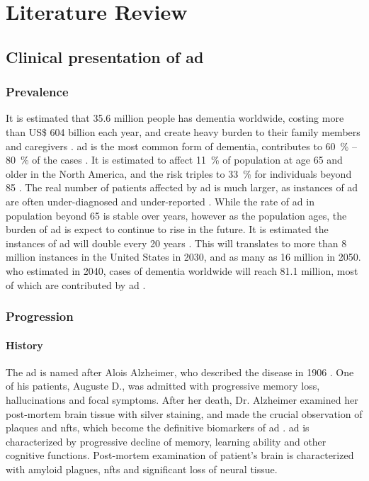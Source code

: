\chapter{Literature Review}

\section{Clinical presentation of \gls{ad}}
\subsection{Prevalence}
It is estimated that 35.6 million people has dementia worldwide, costing more than US\$ 604 billion each year, and create heavy burden to their family members and caregivers \citep{who13}. \gls{ad} is the most common form of dementia, contributes to \SI{60}{\percent} -- \SI{80}{\percent} of the cases \citep{ad16}. It is estimated to affect \SI{11}{\percent} of population at age 65 and older in the North America, and the risk triples to \SI{33}{\percent} for individuals beyond 85 \citep{hebert13}. The real number of patients affected by \gls{ad} is much larger, as instances of \gls{ad} are often under-diagnosed and under-reported \citep{barrett06, zaleta12}. While the rate of \gls{ad} in population beyond 65 is stable over years, however as the population ages, the burden of \gls{ad} is expect to continue to rise in the future. It is estimated the instances of \gls{ad} will double every 20 years \citep{who13, hebert13}. This will translates to more than 8 million instances in the United States in 2030, and as many as 16 million in 2050. \gls{who} estimated in 2040, cases of dementia worldwide will reach 81.1 million, most of which are contributed by \gls{ad} \citep{who13}. 

\subsection{Progression}
\subsubsection{History}
The \gls{ad} is named after Alois Alzheimer, who described the disease in 1906 \citep{goedert06}. One of his patients, Auguste D., was admitted with progressive memory loss, hallucinations and focal symptoms. After her death, Dr. Alzheimer examined her post-mortem brain tissue with silver staining, and made the crucial observation of plaques and \glspl{nft}, which become the definitive biomarkers of \gls{ad} \citep{goedert06, dubois16}. \gls{ad} is characterized by progressive decline of memory, learning ability and other cognitive functions. Post-mortem examination of patient's brain is characterized with amyloid plagues, \glspl{nft} and significant loss of neural tissue.

